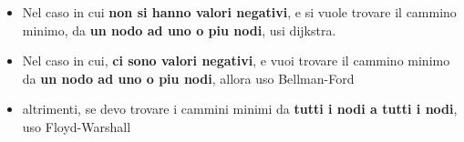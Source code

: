 \documentclass{article}
\begin{document}
\begin{itemize}
    \item Nel caso in cui \textbf{non si hanno valori negativi}, e si vuole trovare il cammino minimo, da \textbf{un nodo ad uno o piu nodi}, usi dijkstra.
    \item Nel caso in cui, \textbf{ci sono valori negativi}, e vuoi trovare il cammino minimo da \textbf{un nodo ad uno o piu nodi}, allora uso Bellman-Ford
    \item altrimenti, se devo trovare i cammini minimi da \textbf{tutti i nodi a tutti i nodi}, uso Floyd-Warshall
\end{itemize}  
\end{document}
